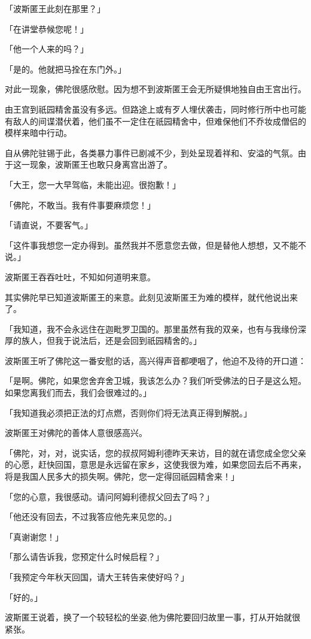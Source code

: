 \documentclass[twoside,openany]{book}
\begin{document}
「波斯匿王此刻在那里？」

「在讲堂恭候您呢！」

「他一个人来的吗？」

「是的。他就把马拴在东门外。」

对此一现象，佛陀很感欣慰。因为想不到波斯匿王会无所疑惧地独自由王宫出行。

由王宫到祇园精舍虽没有多远。但路途上或有歹人埋伏袭击，同时修行所中也可能有敌人的间谍潜伏着，他们虽不一定住在祇园精舍中，但难保他们不乔妆成僧侣的模样来暗中行动。

自从佛陀驻锡于此，各类暴力事件已剧减不少，到处呈现着祥和、安溢的气氛。由于这一现象，波斯匿王也敢只身离宫出游了。

「大王，您一大早驾临，未能出迎。很抱歉！」

「佛陀，不敢当。我有件事要麻烦您！」

「请直说，不要客气。」

「这件事我想您一定办得到。虽然我并不愿意您去做，但是替他人想想，又不能不说。」

波斯匿王吞吞吐吐，不知如何道明来意。

其实佛陀早已知道波斯匿王的来意。此刻见波斯匿王为难的模样，就代他说出来了。

「我知道，我不会永远住在迦毗罗卫国的。那里虽然有我的双亲，也有与我缘份深厚的族人，但我于说法后，还是会回到祇园精舍的。」

波斯匿王听了佛陀这一番安慰的话，高兴得声音都哽咽了，他迫不及待的开口道：

「是啊。佛陀，如果您舍弃舍卫城，我该怎么办？我们听受佛法的日子是这么短。如果您离我们而去，我们会很难过的。」

「我知道我必须把正法的灯点燃，否则你们将无法真正得到解脱。」

波斯匿王对佛陀的善体人意很感高兴。

「佛陀，对，对，说实话，您的叔叔阿姆利德昨天来访，目的就在请您成全您父亲的心愿，赶快回国，意思是永远留在家乡，这使我很为难，如果您回去后不再来，将是我国人民多大的损失啊。佛陀，您一定得回祇园精舍来！」

「您的心意，我很感动。请问阿姆利德叔父回去了吗？」

「他还没有回去，不过我答应他先来见您的。」

「真谢谢您！」

「那么请告诉我，您预定什么时候启程？」

「我预定今年秋天回国，请大王转告来使好吗？」

「好的。」

波斯匿王说着，换了一个较轻松的坐姿,他为佛陀要回归故里一事，打从开始就很紧张。
\end{document}
